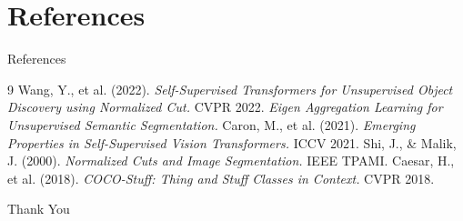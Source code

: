 \documentclass[aspectratio=169]{beamer}
\begin{document}
\section{References}
\begin{frame}{References}
\begin{thebibliography}{9}
 Wang, Y., et al. (2022). \textit{Self-Supervised Transformers for Unsupervised Object Discovery using Normalized Cut.} CVPR 2022.
 \textit{Eigen Aggregation Learning for Unsupervised Semantic Segmentation.}
 Caron, M., et al. (2021). \textit{Emerging Properties in Self-Supervised Vision Transformers.} ICCV 2021.
 Shi, J., \& Malik, J. (2000). \textit{Normalized Cuts and Image Segmentation.} IEEE TPAMI.
 Caesar, H., et al. (2018). \textit{COCO-Stuff: Thing and Stuff Classes in Context.} CVPR 2018.
\end{thebibliography}
\end{frame}
\begin{frame}
\begin{center}
{\Huge Thank You}
\vspace{1cm}

\end{center}
\end{frame}
\end{document}
